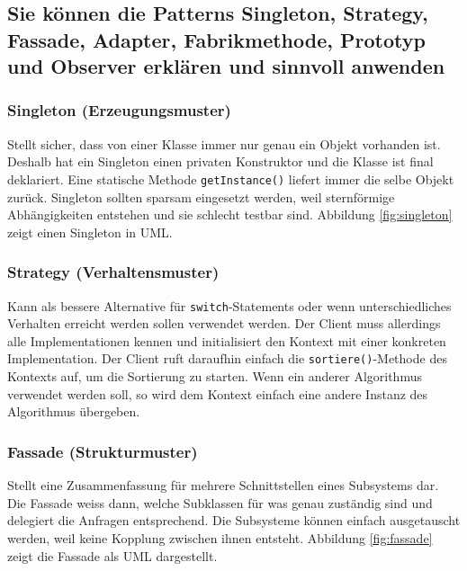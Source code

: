 \newpage

\subsection{Sie können die Patterns Singleton, Strategy, Fassade, Adapter, Fabrikmethode, Prototyp und Observer erklären und sinnvoll anwenden}
\label{sec:patterns}

\subsubsection{Singleton (Erzeugungsmuster)}
Stellt sicher, dass von einer Klasse immer nur genau ein Objekt vorhanden ist. Deshalb hat ein Singleton einen privaten Konstruktor und die Klasse ist final deklariert. Eine statische Methode \texttt{getInstance()} liefert immer die selbe Objekt zurück. Singleton sollten sparsam eingesetzt werden, weil sternförmige Abhängigkeiten entstehen und sie schlecht testbar sind. Abbildung \ref{fig:singleton} zeigt einen Singleton in UML.
    

\subsubsection{Strategy (Verhaltensmuster)}
\label{sec:strategypattern}
Kann als bessere Alternative für \texttt{switch}-Statements oder wenn unterschiedliches Verhalten erreicht werden sollen verwendet werden. Der Client muss allerdings alle Implementationen kennen und initialisiert den Kontext mit einer konkreten Implementation. Der Client ruft daraufhin einfach die \texttt{sortiere()}-Methode des Kontexts auf, um die Sortierung zu starten. Wenn ein anderer Algorithmus verwendet werden soll, so wird dem Kontext einfach eine andere Instanz des Algorithmus übergeben.


\newpage

\subsubsection{Fassade (Strukturmuster)}
Stellt eine Zusammenfassung für mehrere Schnittstellen eines Subsystems dar. Die Fassade weiss dann, welche Subklassen für was genau zuständig sind und delegiert die Anfragen entsprechend. Die Subsysteme können einfach ausgetauscht werden, weil keine Kopplung zwischen ihnen entsteht. Abbildung \ref{fig:fassade} zeigt die Fassade als UML dargestellt.

